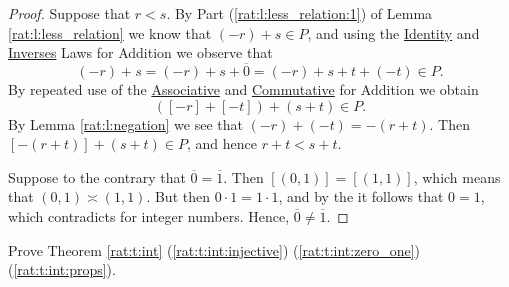 \begin{proof}
	Suppose that $r < s$. By Part (\ref{rat:l:less_relation:1}) of Lemma \ref{rat:l:less_relation} we know that $(-r) + s \in P$, and using the \hyperref[rat:t:props:identity_add]{Identity} and \hyperref[rat:t:props:inverses_add]{Inverses} Laws for Addition we observe that
	$$
		(-r) + s = (-r) + s + \overline{0} = (-r) + s + t + (-t) \in P.
	$$
	By repeated use of the \hyperref[rat:t:props:associative_add]{Associative} and \hyperref[rat:t:props:commutative_add]{Commutative} for Addition we obtain
	$$
		([-r] + [-t]) + (s + t) \in P.
	$$
	By Lemma \ref{rat:l:negation} we see that $(-r) + (-t) = -(r + t)$. Then $[-(r + t)] + (s + t) \in P$, and hence $r + t < s + t$.

	Suppose to the contrary that $\overline{0} = \overline{1}$. Then $[(0, 1)] = [(1, 1)]$, which means that $(0, 1) \asymp (1, 1)$. But then $0 \cdot 1 = 1 \cdot 1$, and by the  it follows that $0 = 1$, which contradicts  for integer numbers. Hence, $\overline{0} \not= \overline{1}$.
\end{proof}


\Newpage
\begin{exercise} %
	Prove Theorem \ref{rat:t:int} (\ref{rat:t:int:injective}) (\ref{rat:t:int:zero_one}) (\ref{rat:t:int:props}).
\end{exercise}

